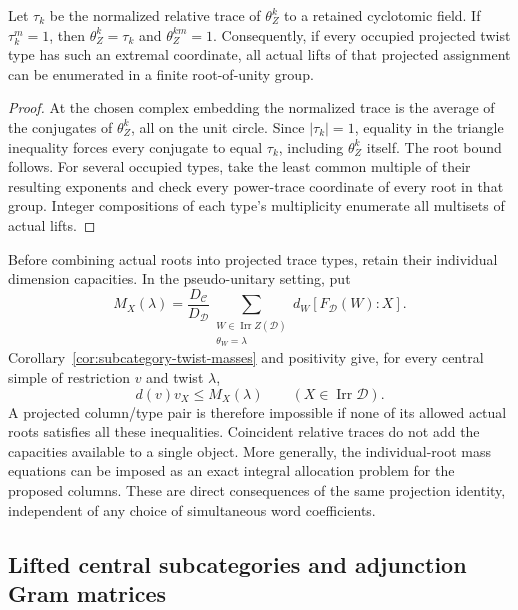 \begin{lemma}
\label{lem:extremal-trace-lift}
Let $\tau_k$ be the normalized relative trace of $\theta_Z^k$ to a
retained cyclotomic field. If $\tau_k^m=1$, then
$\theta_Z^k=\tau_k$ and $\theta_Z^{km}=1$.
Consequently, if every occupied projected twist type has such an
extremal coordinate, all actual lifts of that projected assignment
can be enumerated in a finite root-of-unity group.
\end{lemma}
\begin{proof}
At the chosen complex embedding the normalized trace is the average
of the conjugates of $\theta_Z^k$, all on the unit circle. Since
$|\tau_k|=1$, equality in the triangle inequality forces every
conjugate to equal $\tau_k$, including $\theta_Z^k$ itself. The root
bound follows. For several occupied types, take the least common
multiple of their resulting exponents and check every power-trace
coordinate of every root in that group. Integer compositions of
each type's multiplicity enumerate all multisets of actual lifts.
\end{proof}

Before combining actual roots into projected trace types, retain their
individual dimension capacities. In the pseudo-unitary setting, put
\[
 M_X(\lambda)=\frac{D_{\mathcal C}}{D_{\mathcal D}}
   \sum_{\substack{W\in\operatorname{Irr}Z(\mathcal D)\\
                    \theta_W=\lambda}}
          d_W[F_{\mathcal D}(W):X].
\]
Corollary~\ref{cor:subcategory-twist-masses} and positivity give, for
every central simple of restriction $v$ and twist $\lambda$,
\begin{equation}\label{eq:individual-projection-capacity}
 d(v)v_X\le M_X(\lambda)\qquad(X\in\operatorname{Irr}\mathcal D).
\end{equation}
A projected column/type pair is therefore impossible if none of its
allowed actual roots satisfies all these inequalities. Coincident
relative traces do not add the capacities available to a single object.
More generally, the individual-root mass equations can be imposed as
an exact integral allocation problem for the proposed columns. These
are direct consequences of the same projection identity, independent
of any choice of simultaneous word coefficients.

\subsection{Lifted central subcategories and adjunction Gram matrices}
\label{subsec:centralizer-adjunction-gram}

